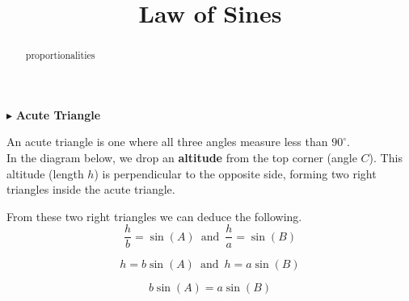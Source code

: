 \documentclass{ximera}
\title{Law of Sines}
\begin{document}
\begin{abstract}
proportionalities
\end{abstract}
\maketitle











$\blacktriangleright$  \textbf{Acute Triangle} 

An acute triangle is one where all three angles measure less than $90^{\circ}$. \\

In the diagram below, we drop an \textbf{altitude} from the top corner (angle $C$). This altitude (length $h$) is perpendicular to the opposite side, forming two right triangles inside the acute triangle.


\begin{image}[3in]
  \end{image}

From these two right triangles we can deduce the following. \\

\[    \frac{h}{b} = \sin(A)   \, \text{ and } \,    \frac{h}{a} = \sin(B)       \]



\[    h = b \sin(A)      \, \text{ and } \,    h = a \sin(B)    \]

\[     b \sin(A)  = a \sin(B)    \]
\end{document}
